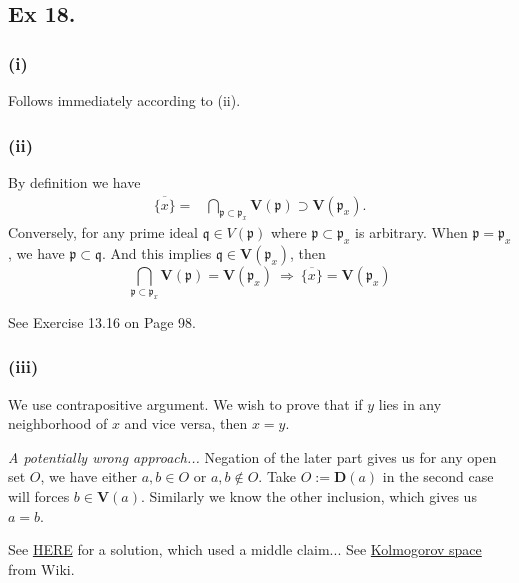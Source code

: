 \subsection{Ex 18.}\label{Atiyah Chapter 1 Ex 18.}

\subsubsection{(i)}

Follows immediately according to (ii).

\subsubsection{(ii)}

By definition we have \begin{align*}
    \overline{\{x\}} =& \bigcap_{\mathfrak p\subset \mathfrak p_x} \mathbf V(\mathfrak p) \supset \mathbf V(\mathfrak p_x).
\end{align*}Conversely, for any prime ideal $\mathfrak q\in V(\mathfrak p)$ where $\mathfrak p\subset \mathfrak p_x$ is arbitrary. When $\mathfrak p=\mathfrak p_x$, we have $\mathfrak p\subset \mathfrak q$. And this implies $\mathfrak q\in \mathbf V(\mathfrak p_x)$, then 
\[\bigcap_{\mathfrak p\subset \mathfrak p_x} \mathbf V(\mathfrak p) = \mathbf V(\mathfrak p_x) ~\Rightarrow~ \overline{\{x\}} = \mathbf V(\mathfrak p_x)\]

See Exercise 13.16 \cite{altman} on Page 98. 

\subsubsection{(iii)} 

We use contrapositive argument. We wish to prove that if $y$ lies in any neighborhood of $x$ and vice versa, then $x=y$.  

\textit{A potentially wrong approach...}
Negation of the later part gives us for any open set $O$, we have either $a,b\in O$ or $a,b\notin O$. Take $O:=\mathbf D(a)$ in the second case will forces $b\in\mathbf V(a)$. Similarly we know the other inclusion, which gives us $a=b$. 

See \href{https://math.stackexchange.com/questions/108503/operatornamespec-a-as-a-topological-space-satisfying-the-t-0-axiom}{HERE}  for a solution, which used a middle claim...
See \href{https://en.wikipedia.org/wiki/Kolmogorov_space}{Kolmogorov space} from Wiki.



